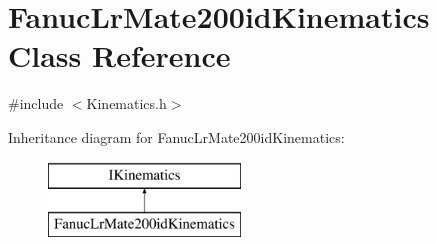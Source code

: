 \hypertarget{classFanucLrMate200idKinematics}{\section{Fanuc\-Lr\-Mate200id\-Kinematics Class Reference}
\label{classFanucLrMate200idKinematics}
}


{\ttfamily \#include $<$Kinematics.\-h$>$}

Inheritance diagram for Fanuc\-Lr\-Mate200id\-Kinematics\-:\begin{figure}[H]
\begin{center}
\leavevmode
\includegraphics[height=2.000000cm]{classFanucLrMate200idKinematics}
\end{center}
\end{figure}
